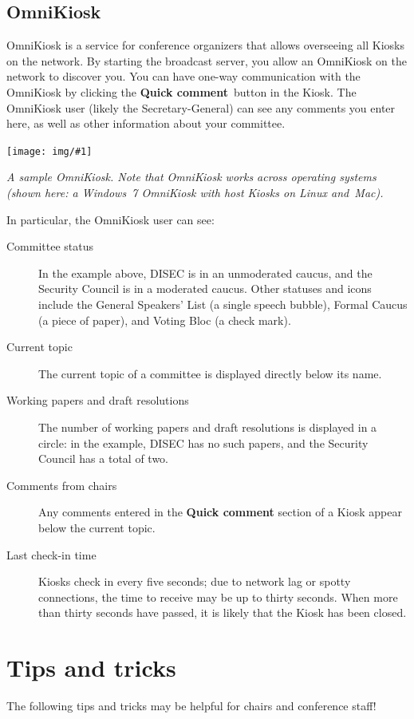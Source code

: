\documentclass{article}
\newcommand{\navitem}[1]{\textbf{#1}}
\newcommand{\encouragebreak}[1]{\vfil\penalty-#1\vfilneg}
\newcommand{\img}[2]{%
  \begin{center}
    \vspace{6pt}
    \encouragebreak{100}
    \centerline{\texttt{[image: img/\#1]}}
    {\slshape #2}
    \encouragebreak{300}
  \end{center}
}
\begin{document}
\subsection{OmniKiosk}

OmniKiosk is a service for conference organizers that allows overseeing all Kiosks on the network.
By starting the broadcast server, you allow an OmniKiosk on the network to discover you.
You can have one-way communication with the OmniKiosk by clicking the \navitem{Quick comment}~button in the Kiosk.
The OmniKiosk user (likely the Secretary-General) can see any comments you enter here, as well as other information about your committee.

\img{omnikiosk}{%
  A sample OmniKiosk.
  Note that OmniKiosk works across operating systems (shown here: a Windows~7 OmniKiosk with host Kiosks on Linux and~Mac).
}

In particular, the OmniKiosk user can see:
\begin{description}
  \item[Committee status]
    In the example above, DISEC is in an unmoderated caucus, and the Security Council is in a moderated caucus.
    Other statuses and icons include the General Speakers' List (a single speech bubble), Formal Caucus (a piece of paper), and Voting Bloc (a check mark).
  \item[Current topic]
    The current topic of a committee is displayed directly below its name.
  \item[Working papers and draft resolutions]
    The number of working papers and draft resolutions is displayed in a circle: in the example, DISEC has no such papers, and the Security Council has a total of two.
  \item[Comments from chairs]
    Any comments entered in the \navitem{Quick comment} section of a Kiosk appear below the current topic.
  \item[Last check-in time]
    Kiosks check in every five seconds; due to network lag or spotty connections, the time to receive may be up to thirty seconds.
    When more than thirty seconds have passed, it is likely that the Kiosk has been closed.
\end{description}

\section{Tips and tricks}

The following tips and tricks may be helpful for chairs and conference staff!
\end{document}
